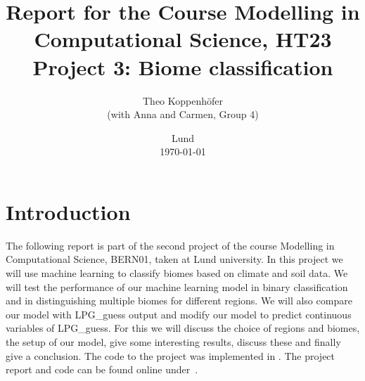 





\title{ Report for the Course Modelling in Computational Science, HT23 \\[1ex]
	  \large Project 3: Biome classification}
\author{Theo Koppenhöfer \\[1ex] (with Anna and Carmen, Group 4)}
\date{Lund \\[1ex] \today}



\graphicspath{{../Plots/}}




\usepackage{pythonhighlight}



\maketitle

\section{Introduction}
The following report is part of the second project of the course Modelling in Computational Science, BERN01, taken at Lund university.
In this project we will use machine learning to classify biomes based on climate and soil data. We will test the performance of our machine
learning model in binary classification and in distinguishing multiple biomes for different regions. We will also compare our model with LPG\_guess output
and modify our model to predict continuous variables of LPG\_guess.
For this we will discuss the choice of regions and biomes, the setup of our model, give some interesting results, discuss these and finally give a conclusion.
The code to the project was implemented in .
The project report and code can be found online under~\cite{Repository}.

